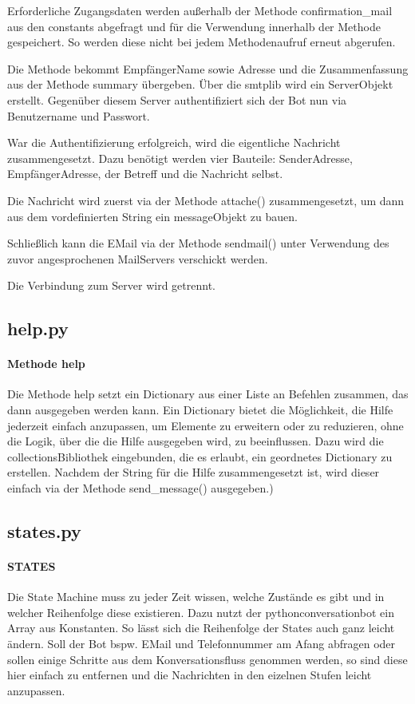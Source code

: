                     Erforderliche Zugangsdaten werden außerhalb der Methode confirmation\_mail aus den constants abgefragt und für die Verwendung innerhalb der Methode gespeichert. So werden diese nicht bei jedem Methodenaufruf erneut abgerufen.

                    Die Methode bekommt Empfänger\-Name sowie \-Adresse und die Zusammenfassung aus der Methode summary übergeben. 
                    Über die smtplib wird ein Server\-Objekt erstellt. Gegenüber diesem Server authentifiziert sich der Bot nun via Benutzername und Passwort.

                    War die Authentifizierung erfolgreich, wird die eigentliche Nachricht zusammengesetzt. Dazu benötigt werden vier Bauteile: Sender\-Adresse, Empfänger\-Adresse, der Betreff und die Nachricht selbst.

                    Die Nachricht wird zuerst via der Methode attache() zusammengesetzt, um dann aus dem vordefinierten String ein message\-Objekt zu bauen.

                    Schließlich kann die E\-Mail via der Methode sendmail() unter Verwendung des zuvor angesprochenen Mail\-Servers verschickt werden.
                    
                    Die Verbindung zum Server wird getrennt.

        
        \subsection{help.py}
            \paragraph{Methode help}
            Die Methode help setzt ein Dictionary aus einer Liste an Befehlen zusammen, das dann ausgegeben werden kann. Ein Dictionary bietet die Möglichkeit, die Hilfe jederzeit einfach anzupassen, um Elemente zu erweitern oder zu reduzieren, ohne die Logik, über die die Hilfe ausgegeben wird, zu beeinflussen. Dazu wird die collections\-Bibliothek eingebunden, die es erlaubt, ein geordnetes Dictionary zu erstellen. Nachdem der String für die Hilfe zusammengesetzt ist, wird dieser einfach via der Methode send\_message() ausgegeben.)


        \subsection{states.py}
            \paragraph{STATES}
                Die State Machine muss zu jeder Zeit wissen, welche Zustände es gibt und in welcher Reihenfolge diese existieren. Dazu nutzt der python\-conversation\-bot \cite{conversationBot} ein Array aus Konstanten. So lässt sich die Reihenfolge der States auch ganz leicht ändern. Soll der Bot bspw. E\-Mail und Telefonnummer am Afang abfragen oder sollen einige Schritte aus dem Konversationsfluss genommen werden, so sind diese hier einfach zu entfernen und die Nachrichten in den eizelnen Stufen leicht anzupassen.

